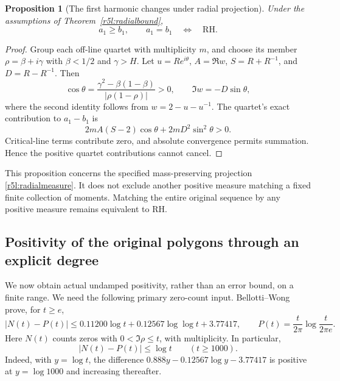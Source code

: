 \documentclass[11pt,a4paper]{article}
\newtheorem{proposition}[theorem]{Proposition}
\theoremstyle{definition}\newtheorem{definition}[theorem]{Definition}
\theoremstyle{remark}\newtheorem{remark}[theorem]{Remark}
\numberwithin{equation}{section}
\begin{document}
\begin{proposition}[The first harmonic changes under radial projection]
\label{r5l:firstmoment}
Under the assumptions of Theorem~\ref{r5l:radialbound},
\[
 a_1\ge b_1,
 \qquad a_1=b_1\quad\Longleftrightarrow\quad\mathrm{RH}.
\]
\end{proposition}
\begin{proof}
Group each off-line quartet with multiplicity $m$, and choose its
member $\rho=\beta+i\gamma$ with $\beta<1/2$ and $\gamma>H$.
Let $u=Re^{i\theta}$, $A=\Re w$, $S=R+R^{-1}$, and
$D=R-R^{-1}$.  Then
\[
 \cos\theta=
 \frac{\gamma^2-\beta(1-\beta)}{|\rho(1-\rho)|}>0,
 \qquad \Im w=-D\sin\theta,
\]
where the second identity follows from $w=2-u-u^{-1}$.
The quartet's exact contribution to $a_1-b_1$ is
\begin{equation}\label{r5l:firstgap}
 2mA(S-2)\cos\theta+2mD^2\sin^2\theta>0.
\end{equation}
Critical-line terms contribute zero, and absolute convergence
permits summation.  Hence the positive quartet contributions cannot
cancel.
\end{proof}

This proposition concerns the specified mass-preserving projection
\eqref{r5l:radialmeasure}.  It does not exclude another positive
measure matching a fixed finite collection of moments.  Matching
the entire original sequence by any positive measure remains
equivalent to RH.

\subsection{Positivity of the original polygons through an explicit degree}

We now obtain actual undamped positivity, rather than an error bound,
on a finite range.  We need the following primary zero-count input.
Bellotti--Wong \cite[Theorem~1.1]{BellottiWong} prove, for $t\ge e$,
\begin{equation}\label{r5l:BW}
 |N(t)-P(t)|\le
 0.11200\log t+0.12567\log\log t+3.77417,
 \qquad P(t)=\frac{t}{2\pi}\log\frac{t}{2\pi e}.
\end{equation}
Here $N(t)$ counts zeros with $0<\Im\rho\le t$, with multiplicity.
In particular,
\begin{equation}\label{r5l:coarsecount}
 |N(t)-P(t)|\le\log t\qquad(t\ge1000).
\end{equation}
Indeed, with $y=\log t$, the difference
$0.888y-0.12567\log y-3.77417$ is positive at $y=\log1000$
and increasing thereafter.
\end{document}
